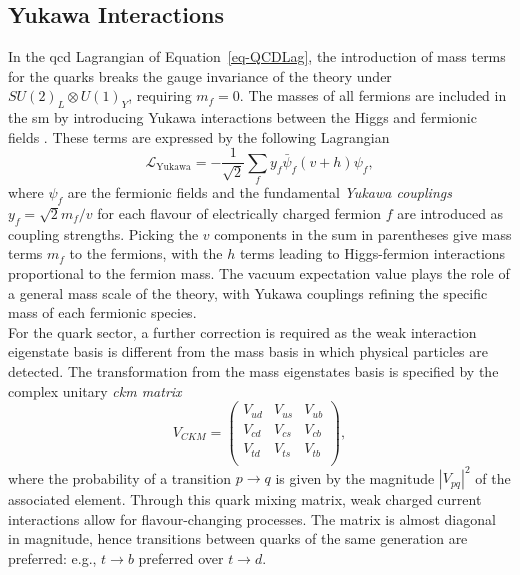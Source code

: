 \subsection{Yukawa Interactions}\label{subset-yukint}
In the \gls{qcd} Lagrangian of Equation~\ref{eq-QCDLag}, the introduction of mass terms for the quarks breaks the gauge invariance of the theory under $SU(2)_L \otimes U(1)_Y$, requiring $m_f = 0$. The masses of all fermions are included in the \gls{sm} by introducing Yukawa interactions between the Higgs and fermionic fields \cite{10.1143/PTPS.1.1}. These terms are expressed by the following Lagrangian
\begin{equation}\label{eq-YukLag}
    \mathcal{L}_{\text{Yukawa}} = - \frac{1}{\sqrt{2}} \sum_{f} 
    y_f \bar{\psi}_f (v + h) \psi_f,
\end{equation}
where $\psi_f$ are the fermionic fields and the fundamental \textit{Yukawa couplings} $y_f = \sqrt{2}m_f/v$ for each flavour of electrically charged fermion $f$ are introduced as coupling strengths. Picking the $v$ components in the sum in parentheses give mass terms $m_f$ to the fermions, with the $h$ terms leading to Higgs-fermion interactions proportional to the fermion mass. The vacuum expectation value plays the role of a general mass scale of the theory, with Yukawa couplings refining the specific mass of each fermionic species. \\

For the quark sector, a further correction is required as the weak interaction eigenstate basis is different from the mass basis in which physical particles are detected. The transformation from the mass eigenstates basis is specified by the complex unitary \textit{\gls{ckm} matrix} \cite{Tanabashi:2018oca}
\begin{equation}
    V_{CKM} = \begin{pmatrix}
            V_{ud} & V_{us} & V_{ub}\\ 
            V_{cd} & V_{cs} & V_{cb}\\ 
            V_{td} & V_{ts} & V_{tb}\\ 
        \end{pmatrix},
\end{equation}
where the probability of a transition $p \rightarrow q$ is given by the magnitude $|V_{pq}|^2$ of the associated element. Through this quark mixing matrix, weak charged current interactions allow for flavour-changing processes. The matrix is almost diagonal in magnitude, hence transitions between quarks of the same generation are preferred: e.g., $t \rightarrow b$ preferred over $t \rightarrow d$.

